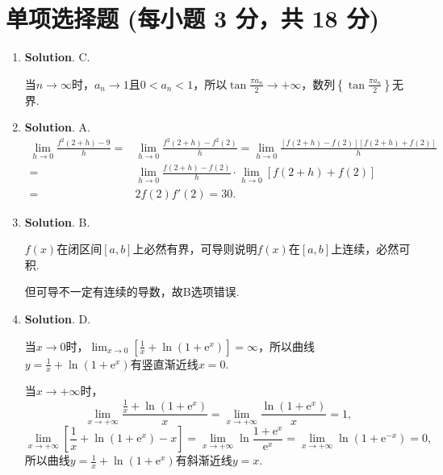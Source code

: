 \documentclass[../main.tex]{subfiles}
\begin{document}
\section{单项选择题 (每小题 3 分，共 18 分)}
\begin{enumerate}
    \item \textbf{Solution}. C.

          当$n\to\infty$时，$a_{n}\to1$且$0<a_{n}<1$，所以$\tan\frac{\pi a_{n}}{2}\to
              +\infty$，数列$\left\{\tan\frac{\pi a_{n}}{2}\right\}$无界.

    \item \textbf{Solution}. A.
          \[
              \begin{aligned}
                  \lim_{h\to0}\frac{f^2(2+h)-9}{h}= {} & \lim_{h\to0}\frac{f^2(2+h)-f^2(2)}{h}=\lim_{h\to0}\frac{\left[f(2+h)-f(2)\right]\left[f(2+h)+f(2)\right]}{h} \\
                  = {}                                 & \lim_{h\to0}\frac{f(2+h)-f(2)}{h}\cdot \lim_{h\to0}\left[f(2+h)+f(2)\right]                                  \\
                  = {}                                 & 2f(2)f'(2)=30.
              \end{aligned}
          \]

    \item \textbf{Solution}. B.

          $f(x)$在闭区间$[a,b]$上必然有界，可导则说明$f(x)$在$[a,b]$上连续，必然可积.

          但可导不一定有连续的导数，故B选项错误.

    \item \textbf{Solution}. D.

          当$x\to0$时，$\lim_{x\to0}\left[\frac{1}{x}+\ln\left(1+\mathrm{e}^{x}\right
                  )\right]=\infty$，所以曲线$y=\frac{1}{x}+\ln\left(1+\mathrm{e}^{x}\right)$有竖直渐近线$x
              =0$.

          当$x\to+\infty$时，
          \[
              \lim_{x\to+\infty}\frac{\frac{1}{x}+\ln\left(1+\mathrm{e}^{x}\right)}{x}
              =\lim_{x\to+\infty}\frac{\ln\left(1+\mathrm{e}^{x}\right)}{x}=1,
          \]
          \[
              \lim_{x\to+\infty}\left[\frac{1}{x}+\ln\left(1+\mathrm{e}^{x}\right)-x\right
              ]=\lim_{x\to+\infty}\ln\frac{1+\mathrm{e}^{x}}{\mathrm{e}^{x}}=\lim_{x\to+\infty}
              \ln\left(1+\mathrm{e}^{-x}\right)=0,
          \]
          所以曲线$y=\frac{1}{x}+\ln\left(1+\mathrm{e}^{x}\right)$有斜渐近线$y=x$.


\end{enumerate}
\end{document}
